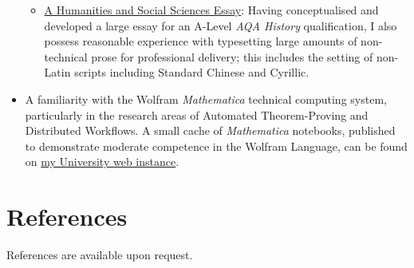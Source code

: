 \documentclass{article}
\newcommand{\githublink}[2]{\href{https://github.com/oliverdixon/#1}{#2}}
\newcommand{\weblink}[2]{\href{https://www-users.york.ac.uk/~od641/#1}{#2}}
\begin{document}
\begin{itemize}
\begin{itemize}
                \item \githublink{opium}{A Humanities and Social Sciences
                Essay}: Having conceptualised and developed a large essay for an
                A-Level \textit{AQA History} qualification, I also possess
                reasonable experience with typesetting large amounts of
                non-technical prose for professional delivery; this includes the
                setting of non-Latin scripts including Standard Chinese and
                Cyrillic.
        \end{itemize}
        \item A familiarity with the Wolfram \textit{Mathematica} technical
        computing system, particularly in the research areas of Automated
        Theorem-Proving and Distributed Workflows. A small cache of
        \textit{Mathematica} notebooks, published to demonstrate moderate
        competence in the Wolfram Language, can be found on
        \weblink{misc\_mma}{my University web instance}.
\end{itemize}
%
%
\section{References}
References are available upon request.
%
\end{document}
